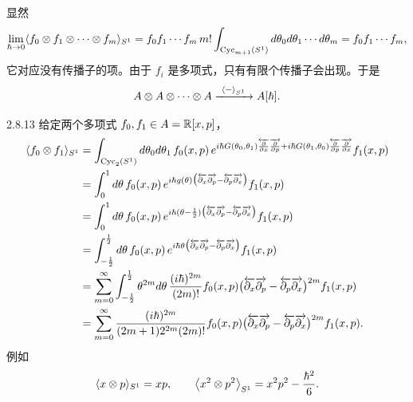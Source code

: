 显然
\[
\lim_{\hbar\to0}\langle f_0\otimes f_1\otimes\cdots\otimes f_m\rangle_{S^1}
=f_0f_1\cdots f_m\,m!\int_{\mathrm{Cyc}_{m+1}(S^1)}d\theta_0d\theta_1\cdots d\theta_m
=f_0f_1\cdots f_m,
\]
它对应没有传播子的项。由于 $f_i$ 是多项式，只有有限个传播子会出现。于是
\[
A\otimes A\otimes\cdots\otimes A
\xrightarrow{\ \langle-\rangle_{S^1}\ }A[\hbar].
\]

\begin{example}{2.8.13}
  给定两个多项式 $f_0,f_1\in A=\mathbb{R}[x,p]$，
  \begin{align*}
  \langle f_0\otimes f_1\rangle_{S^1}
  &=\int_{\mathrm{Cyc}_2(S^1)}d\theta_0d\theta_1\,f_0(x,p)\,
  e^{i\hbar G(\theta_0,\theta_1)\overleftarrow{\frac{\partial}{\partial x}}
  \overrightarrow{\frac{\partial}{\partial p}}
  +i\hbar G(\theta_1,\theta_0)\overleftarrow{\frac{\partial}{\partial p}}
  \overrightarrow{\frac{\partial}{\partial x}}}f_1(x,p)\\
  &=\int_0^1d\theta\,f_0(x,p)\,
  e^{i\hbar g(\theta)\bigl(\overleftarrow{\partial_x}\overrightarrow{\partial_p}
  -\overleftarrow{\partial_p}\overrightarrow{\partial_x}\bigr)}f_1(x,p)\\
  &=\int_0^1d\theta\,f_0(x,p)\,
  e^{i\hbar(\theta-\frac12)\bigl(\overleftarrow{\partial_x}\overrightarrow{\partial_p}
  -\overleftarrow{\partial_p}\overrightarrow{\partial_x}\bigr)}f_1(x,p)\\
  &=\int_{-\frac12}^{\frac12}d\theta\,f_0(x,p)\,
  e^{i\hbar\theta\bigl(\overleftarrow{\partial_x}\overrightarrow{\partial_p}
  -\overleftarrow{\partial_p}\overrightarrow{\partial_x}\bigr)}f_1(x,p)\\
  &=\sum_{m=0}^\infty\int_{-\frac12}^{\frac12}\theta^{2m}d\theta\,
  \frac{(i\hbar)^{2m}}{(2m)!}f_0(x,p)
  \bigl(\overleftarrow{\partial_x}\overrightarrow{\partial_p}
  -\overleftarrow{\partial_p}\overrightarrow{\partial_x}\bigr)^{2m}f_1(x,p)\\
  &=\sum_{m=0}^\infty\frac{(i\hbar)^{2m}}{(2m+1)2^{2m}(2m)!}f_0(x,p)
  \bigl(\overleftarrow{\partial_x}\overrightarrow{\partial_p}
  -\overleftarrow{\partial_p}\overrightarrow{\partial_x}\bigr)^{2m}f_1(x,p).
  \end{align*}
  例如
  \[
  \langle x\otimes p\rangle_{S^1}=xp,\qquad
  \bigl\langle x^2\otimes p^2\bigr\rangle_{S^1}=x^2p^2-\frac{\hbar^2}{6}.
  \]
\end{example}

